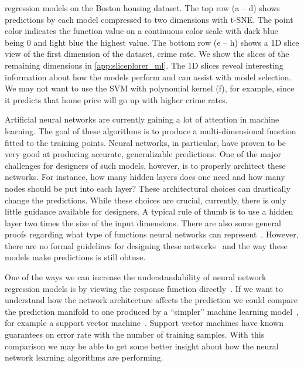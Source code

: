 \begin{figure*}[t]
{    regression models on the Boston housing dataset. The top row (a -- d) shows
    predictions by each model compressed to two dimensions with t-SNE. The
    point color indicates the function value on a
    continuous color scale with dark blue being 0 and
    light blue the highest value. The bottom row (e -- h) shows a 1D slice view
    of the first dimension of the dataset, crime rate. We show the slices of
    the remaining dimensions in \autoref{app:sliceplorer_ml}.
    The 1D slices reveal interesting information about how the models perform and
    can assist with model selection. We may not want to use the SVM with
    polynomial kernel (f), for example, since it predicts that home price will go
    up with higher crime rates.
  }
  \label{fig:nn_comp}
\end{figure*}

Artificial neural networks are currently gaining a lot of attention in machine
learning.  The goal of these algorithms is to produce a multi-dimensional
function fitted to the training points. Neural networks, in particular, have
proven to be very good at producing accurate, generalizable predictions. One of
the major challenges for designers of such models, however, is to properly
architect these networks. For instance, how many hidden layers does one need
and how many nodes should be put into each layer? These architectural choices
can drastically change the predictions.
While these choices are crucial, currently, there is only
little guidance available for designers. A typical rule of thumb is to
use a hidden layer two times the size of the input dimensions.
There are also some general proofs regarding what type of functions neural
networks can represent~\cite{Hornik:1989,Eldan:2016}. However, there are no
formal guidelines for designing these networks~\cite{Goodfellow:2016} and the
way these models make predictions is still obtuse.

One of the ways we can increase the understandability of neural network
regression models is by viewing the response function
directly~\cite{Gleicher:2016}. If we want to understand how the network
architecture affects the prediction we could compare the prediction manifold to
one produced by a ``simpler'' machine learning model~\cite{Ribeiro:2016a}, for
example a support vector machine~\cite{Smola:2004}.  Support vector machines
have known guarantees on error rate with the number of training samples. With
this comparison we may be able to get some better insight about how the neural
network learning algorithms are performing.


